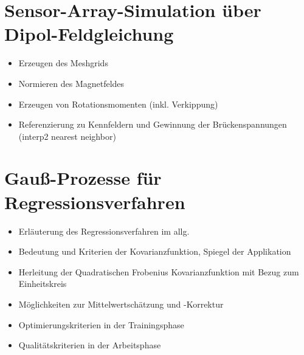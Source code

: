 \section{Sensor-Array-Simulation über Dipol-Feldgleichung}\label{sec:sensor-array-simulation-dipol-feldgleichung}
	\begin{itemize}
		\item Erzeugen des Meshgrids
		\item Normieren des Magnetfeldes
		\item Erzeugen von Rotationsmomenten (inkl. Verkippung)
		\item Referenzierung zu Kennfeldern und Gewinnung der Brückenspannungen (interp2 nearest neighbor)
	\end{itemize}

\section{Gauß-Prozesse für Regressionsverfahren}\label{sec:gauss-prozesse-regressionsverfahren}
	\begin{itemize}
		\item Erläuterung des Regressionsverfahren im allg.
		\item Bedeutung und Kriterien der Kovarianzfunktion, Spiegel der Applikation
		\item Herleitung der Quadratischen Frobenius Kovarianzfunktion mit Bezug zum Einheitskreis
		\item Möglichkeiten zur Mittelwertschätzung und -Korrektur
		\item Optimierungskriterien in der Trainingsphase
		\item Qualitätskriterien in der Arbeitsphase
	\end{itemize}